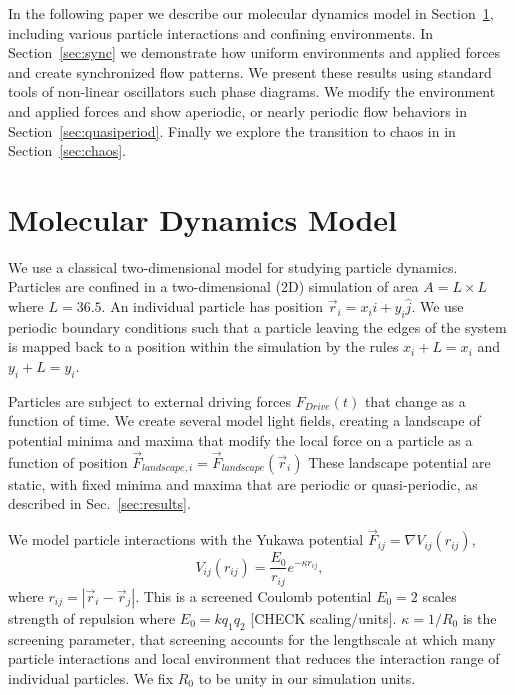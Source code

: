 \documentclass[prb,preprint]{revtex4}
\begin{document}
In the following paper we describe
our molecular dynamics model in Section~\ref{sec:MD},
including various particle interactions and confining environments.
In Section~\ref{sec:sync} we
demonstrate how uniform environments and applied forces
and create synchronized flow patterns.
We present these results using standard tools of non-linear oscillators
such phase diagrams.
We modify the environment and applied forces
and show aperiodic, or nearly periodic flow behaviors
in Section~\ref{sec:quasiperiod}.
Finally we explore the transition to chaos in 
in Section~\ref{sec:chaos}.



\section{Molecular Dynamics Model}
\label{sec:MD}
We use a classical two-dimensional model for 
studying particle dynamics. 
Particles are confined in a two-dimensional (2D) 
simulation of area $A = L \times L$ where $L=36.5$.
An individual particle has
position $\vec{r}_i = x_i \hat{i} + y_i \hat{j}$.
We use periodic boundary conditions
such that a particle leaving the edges of the system is mapped
back to a position within the simulation 
by the rules $x_i+L=x_i$ and $y_i+L=y_i$.

Particles are subject to external driving forces
$F_{Drive}(t)$
that change as a function of time.
We create several model light fields,
creating a landscape of potential minima and maxima
that modify the local force on a particle as a function of position
$\vec{F}_{landscape,i} = \vec{F}_{landscape}(\vec{r}_i)$
These landscape potential are static,
with fixed minima and maxima
that are periodic or quasi-periodic,
as described in Sec.~\ref{sec:results}.

We model particle interactions with
the Yukawa potential $\vec{F}_{ij} = \nabla V_{ij}(r_{ij})$,
\begin{equation}
V_{ij}(r_{ij}) = \frac{E_0}{r_{ij}} e^{-\kappa r_{ij}},
\end{equation}
where $r_{ij} = |\vec{r}_i - \vec{r}_j|$.
This is a
screened Coulomb potential
$E_0=2$ scales strength of repulsion
where $E_0 = k q_1 q_2$  [CHECK scaling/units].
$\kappa = 1/R_0$ is the screening parameter,
that screening accounts for the lengthscale at
which many particle
interactions and local environment
that reduces the interaction range of individual particles.
We fix $R_0$ to be unity in our simulation units.
\end{document}
